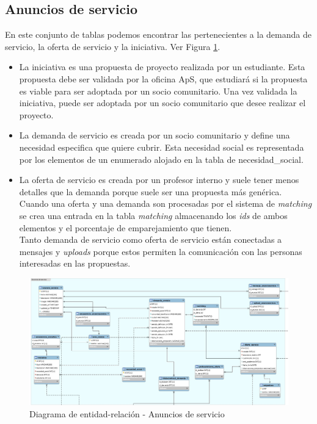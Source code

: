 \documentclass[11pt]{book}
\begin{document}
\subsection{Anuncios de servicio}
En este conjunto de tablas podemos encontrar las pertenecientes a la demanda de servicio, la oferta de servicio y la iniciativa. Ver Figura \ref{fig:anuncios}.
\begin{itemize} 
	\item La iniciativa es una propuesta de proyecto realizada por un estudiante. Esta propuesta debe ser validada por la oficina ApS, que estudiará si la propuesta es viable para ser adoptada por un socio comunitario. Una vez validada la iniciativa, puede ser adoptada por un socio comunitario que desee realizar el proyecto.
	\item La demanda de servicio es creada por un socio comunitario y define una necesidad especifica que quiere cubrir. Esta necesidad social es representada por los elementos de un enumerado alojado en la tabla de necesidad\_social.
	\item La oferta de servicio es creada por un profesor interno y suele tener menos detalles que la demanda porque suele ser una propuesta más genérica.\\
	Cuando una oferta y una demanda son procesadas por el sistema de \textit{matching} se crea una entrada en la tabla \textit{matching} almacenando los \textit{ids} de ambos elementos y el porcentaje de emparejamiento que tienen.\\
	Tanto demanda de servicio como oferta de servicio están conectadas a mensajes y \textit{uploads} porque estos permiten la comunicación con las personas interesadas en las propuestas.
\end{itemize}
\begin{landscape}
	\begin{figure}[p]
		\includegraphics[scale=0.6]{anuncios}
		\caption{Diagrama de entidad-relación - Anuncios de servicio}
		\label{fig:anuncios}
	\end{figure}
\end{landscape}
\end{document}
